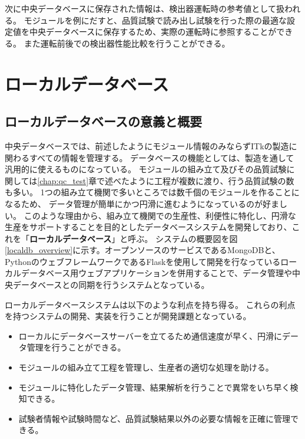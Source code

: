 次に中央データベースに保存された情報は、検出器運転時の参考値として扱われる。
モジュールを例にだすと、品質試験で読み出し試験を行った際の最適な設定値を中央データベースに保存するため、実際の運転時に参照することができる。
また運転前後での検出器性能比較を行うことができる。

\clearpage
\section{ローカルデータベース}
\subsection{ローカルデータベースの意義と概要}
中央データベースでは、前述したようにモジュール情報のみならずITkの製造に関わるすべての情報を管理する。
データベースの機能としては、製造を通して汎用的に使えるものになっている。
モジュールの組み立て及びその品質試験に関しては\ref{chap:qc_test}章で述べたように工程が複数に渡り、行う品質試験の数も多い。
1つの組み立て機関で多いところでは数千個のモジュールを作ることになるため、
データ管理が簡単にかつ円滑に進むようになっているのが好ましい。
このような理由から、組み立て機関での生産性、利便性に特化し、円滑な生産をサポートすることを目的としたデータベースシステムを開発しており、これを「\textbf{ローカルデータベース}」と呼ぶ。
システムの概要図を図\ref{localdb_overview}に示す。オープンソースのサービスであるMongoDB\cite{4-1}と、
PythonのウェブフレームワークであるFlask\cite{4-3}を使用して開発を行なっているローカルデータベース用ウェブアプリケーションを併用することで、データ管理や中央データベースとの同期を行うシステムとなっている。

ローカルデータベースシステムは以下のような利点を持ち得る。
これらの利点を持つシステムの開発、実装を行うことが開発課題となっている。

\begin{itemize}
  \item ローカルにデータベースサーバーを立てるため通信速度が早く、円滑にデータ管理を行うことができる。
  \item モジュールの組み立て工程を管理し、生産者の適切な処理を助ける。
  \item モジュールに特化したデータ管理、結果解析を行うことで異常をいち早く検知できる。
  \item 試験者情報や試験時間など、品質試験結果以外の必要な情報を正確に管理できる。
\end{itemize}

